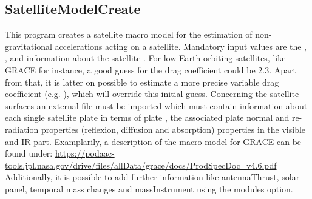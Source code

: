 \clearpage
\subsection{SatelliteModelCreate}\label{SatelliteModelCreate}
This program creates a satellite macro model for the estimation of non-gravitational accelerations acting on a satellite.
Mandatory input values are the , ,  and information
about the satellite . For low Earth orbiting satellites, like GRACE for instance, a good guess
for the drag coefficient could be 2.3. Apart from that, it is latter on possible to estimate a more precise variable drag coefficient
(e.g. ), which will override this initial guess.
Concerning the satellite surfaces an external file must be imported which must contain information about each single
 satellite plate in terms of plate , the associated plate normal and re-radiation properties
(reflexion, diffusion and absorption) properties in the visible and IR part. Examplarily, a description of
the macro model for GRACE can be found under:
\url{https://podaac-tools.jpl.nasa.gov/drive/files/allData/grace/docs/ProdSpecDoc_v4.6.pdf}
Additionally, it is possible to add further information like antennaThrust, solar panel, temporal mass changes and
massInstrument using the modules option.


